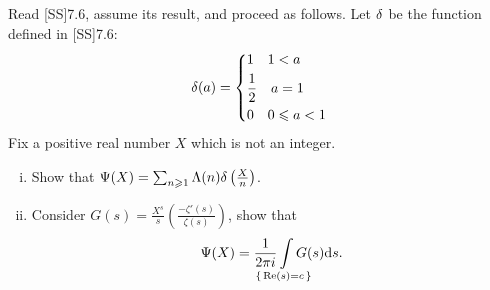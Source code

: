 \documentclass[12pt]{memoir}
\begin{document}
\begin{Ej}
    Read [SS]7.6, assume its result, and proceed as follows. Let $\delta$ be the function defined in [SS]7.6:
    $$\dl(a)=\left\lbrace
    \begin{aligned}
        &1\quad 1<a\\
        &\half\quad a=1\\
        &0\quad 0\leq a<1\\
    \end{aligned}
    \right.$$
    Fix a positive real number $X$ which is not an integer.
    \begin{enumerate}[i)]
        \item Show that $\Psi(X)=\sum_{n\geqslant 1}\Lambda(n)\delta\left(\frac{X}{n}\right)$.
        \item Consider $G(s)=\frac{X^s}{s}\left(\frac{-\zeta'(s)}{\zeta(s)}\right)$, show that 
        $$\Psi(X)=\frac{1}{2\pi i}\hspace*{-1.5em}\int\limits_{\set{\Re(s)=c}}\hspace*{-1.5em}G(s)\dd s.$$
    \end{enumerate}
\end{Ej}
\end{document}
